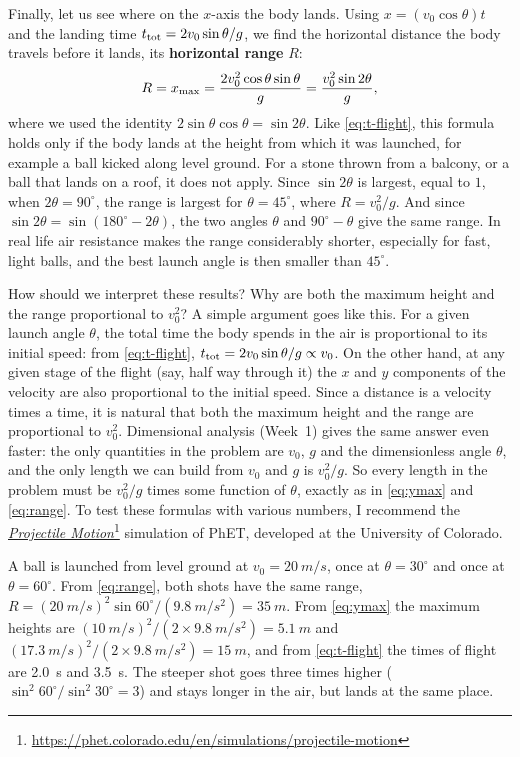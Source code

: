 \documentclass[11pt,a4paper]{article}
\begin{document}
Finally, let us see where on the $x$-axis the body lands. Using $x = (v_0\cos\theta)t$ and the
landing time $t_{\mathrm{tot}} = 2v_0\sin\theta/g$, we find the horizontal distance the body travels
before it lands, its \textbf{horizontal range} $R$:
\begin{equation}\label{eq:range}
  R = x_{\mathrm{max}} = \frac{2v_0^2\cos\theta\sin\theta}{g} = \frac{v_0^2\sin 2\theta}{g} ,
\end{equation}
where we used the identity $2\sin\theta\cos\theta = \sin 2\theta$. Like \eqref{eq:t-flight}, this
formula holds only if the body lands at the height from which it was launched, for example a ball
kicked along level ground. For a stone thrown from a balcony, or a ball that lands on a roof, it
does not apply. Since $\sin 2\theta$ is
largest, equal to $1$, when $2\theta = 90^\circ$, the range is largest for $\theta = 45^\circ$,
where $R = v_0^2/g$. And since $\sin 2\theta = \sin(180^\circ - 2\theta)$, the two angles $\theta$
and $90^\circ - \theta$ give the same range. In real life air resistance makes the range
considerably shorter, especially for fast, light balls, and the best launch angle is then smaller
than $45^\circ$.

How should we interpret these results? Why are both the maximum height and the range proportional
to $v_0^2$? A simple argument goes like this. For a given launch angle $\theta$, the total time the
body spends in the air is proportional to its initial speed: from \eqref{eq:t-flight},
$t_{\mathrm{tot}} = 2v_0\sin\theta/g \propto v_0$. On the other hand, at any given stage
of the flight (say, half way through it) the $x$ and $y$ components of the velocity are also
proportional to the initial speed. Since a distance is a velocity times a time, it is natural that
both the maximum height and the range are proportional to $v_0^2$. Dimensional analysis (Week~1)
gives the same answer even faster: the only quantities in the problem are $v_0$, $g$ and the
dimensionless angle $\theta$, and the only length we can build from $v_0$ and $g$ is $v_0^2/g$. So
every length in the problem must be $v_0^2/g$ times some function of $\theta$, exactly as in
\eqref{eq:ymax} and \eqref{eq:range}. To test these formulas with various numbers, I recommend the
\href{https://phet.colorado.edu/en/simulations/projectile-motion}{\emph{Projectile
Motion}}\footnote{\url{https://phet.colorado.edu/en/simulations/projectile-motion}} simulation of
PhET, developed at the University of Colorado.

\begin{example}
A ball is launched from level ground at $v_0 = \qty{20}{m/s}$, once at $\theta = 30^\circ$ and once
at $\theta = 60^\circ$. From \eqref{eq:range}, both shots have the same range,
$R = (\qty{20}{m/s})^2\sin 60^\circ/(\qty{9.8}{m/s^2}) = \qty{35}{m}$. From \eqref{eq:ymax} the
maximum heights are $(\qty{10}{m/s})^2/(2\times\qty{9.8}{m/s^2}) = \qty{5.1}{m}$ and
$(\qty{17.3}{m/s})^2/(2\times\qty{9.8}{m/s^2}) = \qty{15}{m}$, and from \eqref{eq:t-flight} the
times of flight are \qty{2.0}{s} and \qty{3.5}{s}. The steeper shot goes three times higher
($\sin^2 60^\circ/\sin^2 30^\circ = 3$) and stays longer in the air, but lands at the same place.
\end{example}
\end{document}
